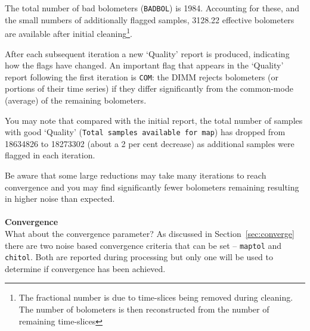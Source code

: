 \documentclass[twoside,11pt]{article}
\newcommand{\htmlref}[2]{#1}
\newcommand{\latexhtml}[2]{#1}
\renewcommand{\_}{\texttt{\symbol{95}}}
\newcommand{\cref}[3]{\latexhtml{#1~\ref{#2}}{\htmlref{#3}{#2}}}
\begin{document}
The total number of bad bolometers (\texttt{BADBOL}) is 1984.
Accounting for these, and the small numbers of additionally flagged
samples, 3128.22 effective bolometers are available after initial
cleaning\footnote{The fractional number is due to time-slices being
removed during cleaning. The number of bolometers is then
reconstructed from the number of remaining time-slices}.


After each subsequent iteration a new `Quality' report is produced,
indicating how the flags have changed. An important flag that appears
in the `Quality' report following the first iteration is \texttt{COM}:
the DIMM rejects bolometers (or portions of their time series) if they
differ significantly from the common-mode (average) of the remaining
bolometers.

You may note that compared with the initial report, the total number of samples
with good `Quality' (\texttt{Total samples available for map}) has
dropped from 18634826 to 18273302 (about a 2 per cent decrease) as
additional samples were flagged in each iteration.


Be aware that some large reductions may take many iterations to reach
convergence and you may find significantly fewer bolometers remaining
resulting in higher noise than expected.
\\ \\
\textbf{Convergence}\\
What about the convergence parameter? As discussed in
\cref{Section}{sec:converge}{Convergence} there are two noise based
convergence criteria that can be set -- \texttt{maptol} and \texttt{chitol}. Both
are reported during processing but only one will be used to determine
if convergence has been achieved.
\end{document}

